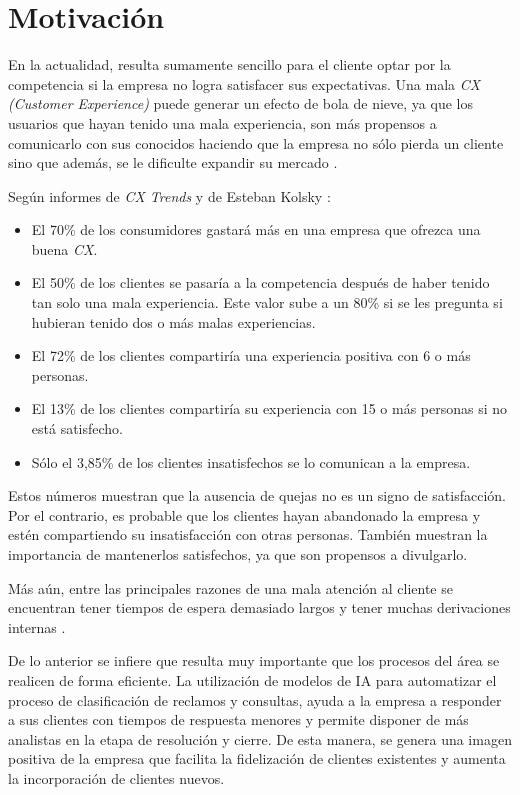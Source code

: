 
\section{Motivación}

En la actualidad, resulta sumamente sencillo para el cliente optar por la competencia si la empresa no logra satisfacer sus expectativas. Una mala \textit{CX (Customer Experience)} puede generar un efecto de bola de nieve, ya que los usuarios que hayan tenido una mala experiencia, son más propensos a comunicarlo con sus conocidos haciendo que la empresa no sólo pierda un cliente sino que además, se le dificulte expandir su mercado \citep{WEBSITE:9}.

Según informes de \textit{CX Trends} \citep{cxtrends}\citep{WEBSITE:4}\citep{WEBSITE:10} y de Esteban Kolsky \citep{WEBSITE:11}:

\begin{itemize}
\item El 70\% de los consumidores gastará más en una empresa que ofrezca una buena \textit{CX}.
\item El 50\% de los clientes se pasaría a la competencia después de haber tenido tan solo una mala experiencia. Este valor sube a un 80\% si se les pregunta si hubieran tenido dos o más malas experiencias.
\item El 72\% de los clientes compartiría una experiencia positiva con 6 o más personas.
\item El 13\% de los clientes compartiría su experiencia con 15 o más personas si no está satisfecho.
\item Sólo el 3,85\% de los clientes insatisfechos se lo comunican a la empresa.
\end{itemize}

Estos números muestran que la ausencia de quejas no es un signo de satisfacción. Por el contrario, es probable que los clientes hayan abandonado la empresa y estén compartiendo su insatisfacción con otras personas. También muestran la importancia de mantenerlos satisfechos, ya que son propensos a divulgarlo.

Más aún, entre las principales razones de una mala atención al cliente se encuentran tener tiempos de espera demasiado largos \citep{WEBSITE:12} y tener muchas derivaciones internas \citep{WEBSITE:13}.

De lo anterior se infiere que resulta muy importante que los procesos del área se realicen de forma eficiente. La utilización de modelos de IA para automatizar el proceso de clasificación de reclamos y consultas, ayuda a la empresa a responder a sus clientes con tiempos de respuesta menores y permite disponer de más analistas en la etapa de resolución y cierre. De esta manera, se genera una imagen positiva de la empresa que facilita la fidelización de clientes existentes y aumenta la incorporación de clientes nuevos.

